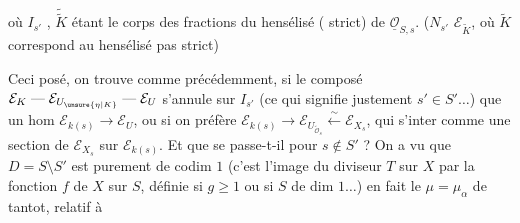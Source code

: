 où $I_{s'}$  , $\widetilde{\widetilde K}$ étant le corps
des fractions du hensélisé ( strict)
de $\underline{\mathcal O}_{S,s}$. ($N_{s'}$  
$\mathcal E_{\widetilde K}$, où $\widetilde K$ correspond au hensélisé pas strict)

Ceci posé, on trouve comme précédemment,
si le composé  $\mathcal E_K\mathrel{\text{---}}\mathcal E_{U_{\unsure{\eta|K}}}\mathrel{\text{---}}\mathcal E_U$
s'annule sur $I_{s'}$   (ce qui signifie
justement  $s'\in S'\ldots$) que un hom
$\mathcal E_{k(s)}\longrightarrow\mathcal E_U$, ou si on préfère
$\mathcal E_{k(s)}\longrightarrow\mathcal E_{U_{\widetilde{\mathcal O}_s}}\xleftarrow{\sim}\mathcal E_{X_s}$, qui   s'inter%
 comme une section de $\mathcal E_{X_s}$ sur
$\mathcal E_{k(s)}$. Et que se passe-t-il pour
$s\notin S'$ ?  On a vu que
$D=S\setminus S'$ est purement de codim $1$
(c'est l'image  du diviseur
$T$ sur $X$ par la fonction $f$ de $X$ sur $S$,
définie si $g\geq1$ ou si $S$ de dim $1\ldots$)
en fait le $\mu=\mu_\alpha$ de tantot, relatif à
